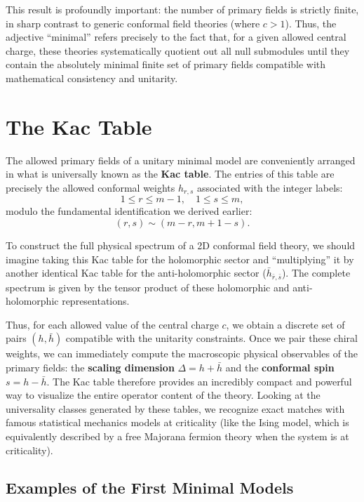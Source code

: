 This result is profoundly important: the number of primary fields is strictly finite, in sharp contrast to generic conformal field theories (where \(c > 1\)). Thus, the adjective ``minimal'' refers precisely to the fact that, for a given allowed central charge, these theories systematically quotient out all null submodules until they contain the absolutely minimal finite set of primary fields compatible with mathematical consistency and unitarity.

\section{The Kac Table}

The allowed primary fields of a unitary minimal model are conveniently arranged in what is universally known as the \textbf{Kac table}. The entries of this table are precisely the allowed conformal weights \(h_{r,s}\) associated with the integer labels:
\[
    1 \leq r \leq m - 1, \quad 1 \leq s \leq m,
\]
modulo the fundamental identification we derived earlier:
\[
    (r,s) \sim (m-r, m+1-s).
\]

To construct the full physical spectrum of a 2D conformal field theory, we should imagine taking this Kac table for the holomorphic sector and ``multiplying'' it by another identical Kac table for the anti-holomorphic sector (\(\bar{h}_{\bar{r},\bar{s}}\)). The complete spectrum is given by the tensor product of these holomorphic and anti-holomorphic representations.

Thus, for each allowed value of the central charge \(c\), we obtain a discrete set of pairs \((h, \bar{h})\) compatible with the unitarity constraints. Once we pair these chiral weights, we can immediately compute the macroscopic physical observables of the primary fields: the \textbf{scaling dimension} \(\Delta = h + \bar{h}\) and the \textbf{conformal spin} \(s = h - \bar{h}\). The Kac table therefore provides an incredibly compact and powerful way to visualize the entire operator content of the theory. Looking at the universality classes generated by these tables, we recognize exact matches with famous statistical mechanics models at criticality (like the Ising model, which is equivalently described by a free Majorana fermion theory when the system is at criticality).

\subsection{Examples of the First Minimal Models}

